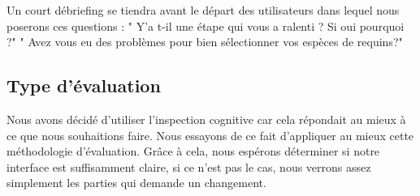 \documentclass{article}
\begin{document}
Un court débriefing se tiendra avant le départ des utilisateurs dans lequel nous poserons ces questions : 
" Y'a t-il une étape qui vous a ralenti ? Si oui pourquoi ?"
" Avez vous eu des problèmes pour bien sélectionner vos espèces de requins?"
\subsection{Type d'évaluation}
Nous avons décidé d'utiliser l'inspection cognitive car cela répondait au mieux à ce que nous souhaitions faire. Nous essayons de ce fait d'appliquer au mieux cette méthodologie d'évaluation. Grâce à cela, nous espérons déterminer si notre interface est suffisamment claire, si ce n'est pas le cas, nous verrons assez simplement les parties qui demande un changement.
\end{document}
